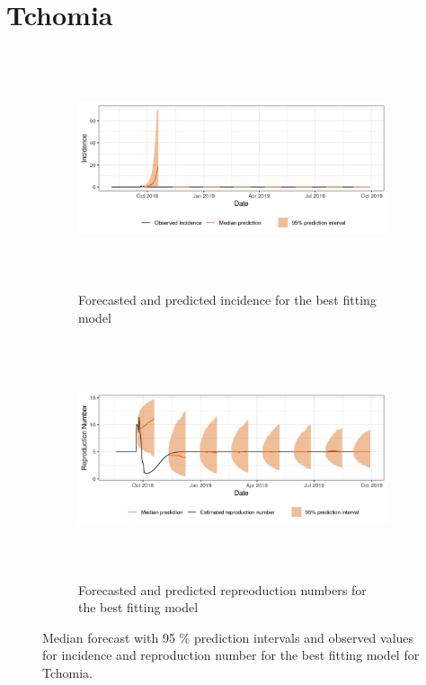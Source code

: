  \section{ Tchomia }\begin{figure}[H]\begin{subfigure}{\textwidth}  \centering  \includegraphics[width=0.9\linewidth, height=7cm]{../output/Tchomia_predictions.png}  \caption{Forecasted and predicted incidence for the best fitting model}\end{subfigure}

\begin{subfigure}{\textwidth}  \centering  \includegraphics[width=0.9\linewidth, height=7cm]{../output/Tchomia_Rs.png}  \caption{Forecasted and predicted repreoduction numbers for the best fitting model}\end{subfigure}  \caption{Median forecast with 95 \% prediction intervals and observed values for incidence and reproduction number for the best fitting model for Tchomia.}\end{figure}

